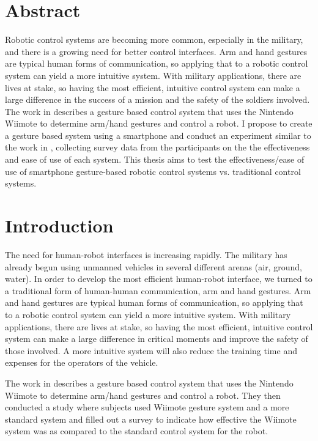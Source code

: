 \documentclass[12pt, letterpaper]{report}
\begin{document}
\chapter*{Abstract}
Robotic control systems are becoming more common, especially in the military, and there is a growing need for better control interfaces. Arm and hand gestures are typical human forms of communication, so applying that to a robotic control system can yield a more intuitive system. With military applications, there are lives at stake, so having the most efficient, intuitive control system can make a large difference in the success of a mission and the safety of the soldiers involved. 
The work in \cite{Varcholik_Barber_Nicholson_2008} describes a gesture based control system that uses the Nintendo Wiimote to determine arm/hand gestures and control a robot. I propose to create a gesture based system using a smartphone and conduct an experiment similar to the work in \cite{Varcholik_Barber_Nicholson_2008}, collecting survey data from the participants on the the effectiveness and ease of use of each system. This thesis aims to test the effectiveness/ease of use of smartphone gesture-based robotic control systems vs. traditional control systems.

\chapter{Introduction}
\setcounter{page}{1}

The need for human-robot interfaces is increasing rapidly. The military has already begun using unmanned vehicles in several different arenas (air, ground, water). In order to develop the most efficient human-robot interface, we turned to a traditional form of human-human communication, arm and hand gestures. Arm and hand gestures are typical human forms of communication, so applying that to a robotic control system can yield a more intuitive system. With military applications, there are lives at stake, so having the most efficient, intuitive control system can make a large difference in critical moments and improve the safety of those involved. A more intuitive system will also reduce the training time and expenses for the operators of the vehicle.

The work in \cite{Varcholik_Barber_Nicholson_2008} describes a gesture based control system that uses the Nintendo Wiimote to determine arm/hand gestures and control a robot. They then conducted a study where subjects used Wiimote gesture system and a more standard system and filled out a survey to indicate how effective the Wiimote system was as compared to the standard control system for the robot.
\end{document}
